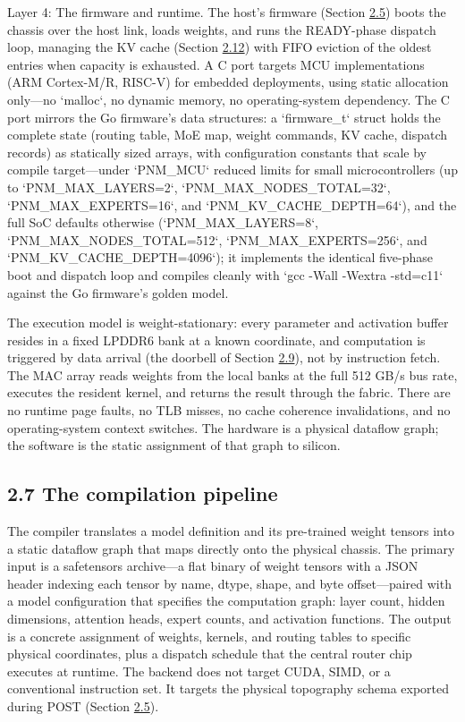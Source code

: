 \documentclass[10pt,twocolumn]{article}
\begin{document}
Layer 4: The firmware and runtime. The host's firmware (Section \hyperref[sec:2.5]{2.5}) boots the chassis over the host link, loads weights, and runs the READY-phase dispatch loop, managing the KV cache (Section \hyperref[sec:2.12]{2.12}) with FIFO eviction of the oldest entries when capacity is exhausted. A C port targets MCU implementations (ARM Cortex-M/R, RISC-V) for embedded deployments, using static allocation only---no `malloc`, no dynamic memory, no operating-system dependency. The C port mirrors the Go firmware's data structures: a `firmware\_t` struct holds the complete state (routing table, MoE map, weight commands, KV cache, dispatch records) as statically sized arrays, with configuration constants that scale by compile target---under `PNM\_MCU` reduced limits for small microcontrollers (up to `PNM\_MAX\_LAYERS=2`, `PNM\_MAX\_NODES\_TOTAL=32`, `PNM\_MAX\_EXPERTS=16`, and `PNM\_KV\_CACHE\_DEPTH=64`), and the full SoC defaults otherwise (`PNM\_MAX\_LAYERS=8`, `PNM\_MAX\_NODES\_TOTAL=512`, `PNM\_MAX\_EXPERTS=256`, and `PNM\_KV\_CACHE\_DEPTH=4096`); it implements the identical five-phase boot and dispatch loop and compiles cleanly with `gcc -Wall -Wextra -std=c11` against the Go firmware's golden model.

The execution model is weight-stationary: every parameter and activation buffer resides in a fixed LPDDR6 bank at a known coordinate, and computation is triggered by data arrival (the doorbell of Section \hyperref[sec:2.9]{2.9}), not by instruction fetch. The MAC array reads weights from the local banks at the full 512 GB/s bus rate, executes the resident kernel, and returns the result through the fabric. There are no runtime page faults, no TLB misses, no cache coherence invalidations, and no operating-system context switches. The hardware is a physical dataflow graph; the software is the static assignment of that graph to silicon.

\subsection*{2.7 The compilation pipeline}\label{sec:2.7}

The compiler translates a model definition and its pre-trained weight tensors into a static dataflow graph that maps directly onto the physical chassis. The primary input is a safetensors archive---a flat binary of weight tensors with a JSON header indexing each tensor by name, dtype, shape, and byte offset---paired with a model configuration that specifies the computation graph: layer count, hidden dimensions, attention heads, expert counts, and activation functions. The output is a concrete assignment of weights, kernels, and routing tables to specific physical coordinates, plus a dispatch schedule that the central router chip executes at runtime. The backend does not target CUDA, SIMD, or a conventional instruction set. It targets the physical topography schema exported during POST (Section \hyperref[sec:2.5]{2.5}).
\end{document}
